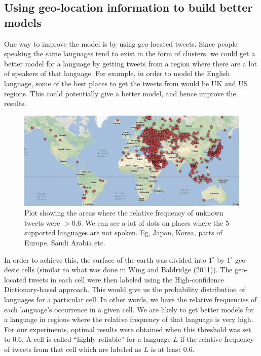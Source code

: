 \documentclass[11pt]{article}
\begin{document}
\subsection{Using geo-location information to build better models}
One way to improve the model is by using geo-located tweets. Since people speaking the same languages tend to exist in the form of clusters, we could get a better model for a language by getting tweets from a region where there are a lot of speakers of that language. For example, in order to model the English language, some of the best places to get the tweets from would be UK and US regions. This could potentially give a better model, and hence improve the results.

\begin{figure}[ht]
\includegraphics[scale=0.5]{unknown_plot.png}
\caption{\footnotesize Plot showing the areas where the relative frequency of unknown tweets were $> 0.6$. We can see a lot of dots on places where the 5 supported languages are not spoken. Eg, Japan, Korea, parts of Europe, Saudi Arabia etc.}
\label{fig:s4}
\end{figure}

In order to achieve this, the surface of the earth was divided into $1^{\circ}$ by $1^{\circ}$ geo-desic cells (similar to what was done in Wing and Baldridge (2011)). The geo-located tweets in each cell were then labeled using the High-confidence Dictionary-based approach. This would give us the probability distribution of languages for a particular cell. In other words, we have the relative frequencies of each language's occurrence in a given cell. We are likely to get better models for a language in regions where the relative frequency of that language is very high. For our experiments, optimal results were obtained when this threshold was set to 0.6. A cell is called ``highly reliable'' for a language $L$ if the relative frequency of tweets from that cell which are labeled as $L$ is at least 0.6.
\end{document}
